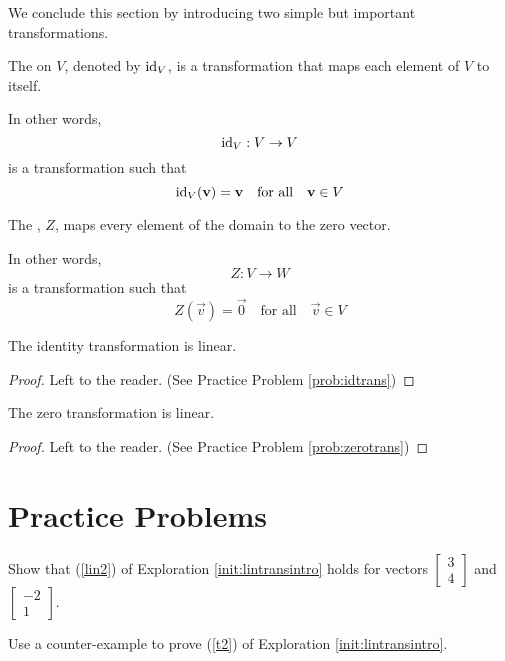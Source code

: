 \documentclass{ximera}
\begin{document}
We conclude this section by introducing two simple but important transformations.

\begin{definition}\label{def:idtransonrn}
The  on $V$, denoted by $\text{id}_V$, is a transformation that maps each element of $V$ to itself.

In other words,
$$\text{id}_V:V\rightarrow V$$ is a transformation such that $$\text{id}_V(\mathbf{v})=\mathbf{v}\quad\text{for all}\quad \mathbf{v} \in V$$
\end{definition}

\begin{definition}\label{def:zerotransonrn}
The , $Z$, maps every element of the domain to the zero vector.

In other words,
$$Z:V\rightarrow W$$ is a transformation such that $$Z(\vec{v})=\vec{0}\quad\text{for all}\quad \vec{v} \in V$$
\end{definition}

\begin{theorem}\label{th:idlintrans}
The identity transformation is linear.
\end{theorem}
\begin{proof}
Left to the reader. (See Practice Problem \ref{prob:idtrans})
\end{proof}

\begin{theorem}\label{th:zerolintrans}
The zero transformation is linear.
\end{theorem}
\begin{proof}
Left to the reader.  (See Practice Problem \ref{prob:zerotrans})
\end{proof}


\section*{Practice Problems}
\begin{problem}\label{prob:sum}

Show that (\ref{lin2}) of Exploration \ref{init:lintransintro} holds for vectors $\begin{bmatrix}3\\4\end{bmatrix}$ and $\begin{bmatrix}-2\\1\end{bmatrix}$.
\end{problem}

\begin{problem}\label{prob:prob2}
Use a counter-example to prove (\ref{t2}) of Exploration \ref{init:lintransintro}.
\end{problem}
\end{document}
